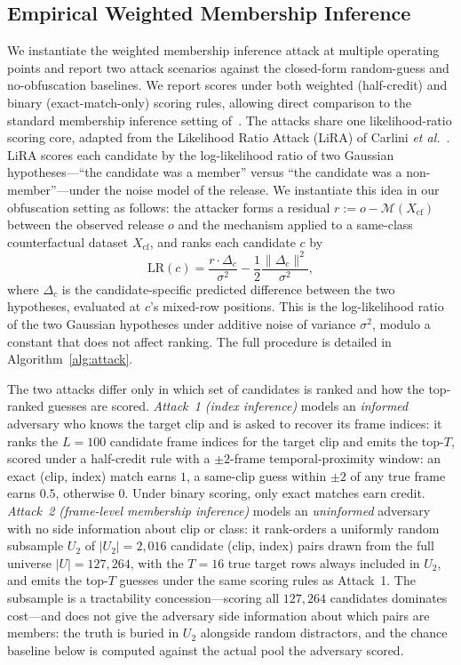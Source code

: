 \documentclass[letterpaper]{article} %
\begin{document}
\subsection{Empirical Weighted Membership Inference}
\label{subsec:mia_operating_point}

We instantiate the weighted membership inference attack at multiple operating points and report two attack scenarios against the closed-form random-guess and no-obfuscation baselines. We report scores under both weighted (half-credit) and binary (exact-match-only) scoring rules, allowing direct comparison to the standard membership inference setting of~\cite{xiao2024formal}. The attacks share one likelihood-ratio scoring core, adapted from the Likelihood Ratio Attack (LiRA) of Carlini \textit{et al.}~\cite{carlini2022firstprinciples}. LiRA scores each candidate by the log-likelihood ratio of two Gaussian hypotheses---``the candidate was a member'' versus ``the candidate was a non-member''---under the noise model of the release. We instantiate this idea in our obfuscation setting as follows: the attacker forms a residual $r := o - \mathcal{M}(X_{\mathrm{cf}})$ between the observed release $o$ and the mechanism applied to a same-class counterfactual dataset $X_{\mathrm{cf}}$, and ranks each candidate $c$ by
\[
\mathrm{LR}(c) = \frac{r \cdot \Delta_c}{\sigma^2} - \frac{1}{2} \frac{\|\Delta_c\|^2}{\sigma^2},
\]
where $\Delta_c$ is the candidate-specific predicted difference between the two hypotheses, evaluated at $c$'s mixed-row positions. This is the log-likelihood ratio of the two Gaussian hypotheses under additive noise of variance $\sigma^2$, modulo a constant that does not affect ranking. The full procedure is detailed in Algorithm~\ref{alg:attack}.

 The two attacks differ only in which set of candidates is ranked and how the top-ranked guesses are scored. \emph{Attack~1 (index inference)} models an \textit{informed} adversary who knows the target clip and is asked to recover its frame indices: it ranks the $L = 100$ candidate frame indices for the target clip and emits the top-$T$, scored under a half-credit rule with a $\pm 2$-frame temporal-proximity window: an exact (clip, index) match earns $1$, a same-clip guess within $\pm 2$ of any true frame earns $0.5$, otherwise $0$. Under binary scoring, only exact matches earn credit.
\emph{Attack~2 (frame-level membership inference)} models an \textit{uninformed} adversary with no side information about clip or class: it rank-orders a uniformly random subsample $U_2$ of $|U_2| = 2{,}016$ candidate (clip, index) pairs drawn from the full universe $|U| = 127{,}264$, with the $T = 16$ true target rows always included in $U_2$, and emits the top-$T$ guesses under the same scoring rules as Attack~1. The subsample is a tractability concession---scoring all $127{,}264$ candidates dominates cost---and does not give the adversary side information about which pairs are members: the truth is buried in $U_2$ alongside random distractors, and the chance baseline below is computed against the actual pool the adversary scored.
\end{document}
